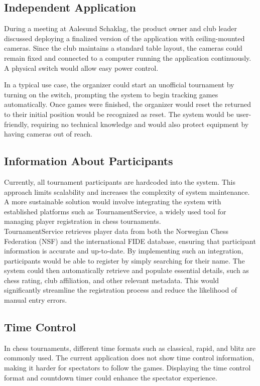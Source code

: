 \subsection{Independent Application}
During a meeting at Aalesund Schaklag, the product owner and club leader discussed deploying a finalized version of the application with ceiling-mounted cameras. Since the club maintains a standard table layout, the cameras could remain fixed and connected to a computer running the application continuously. A physical switch would allow easy power control.

In a typical use case, the organizer could start an unofficial tournament by turning on the switch, prompting the system to begin tracking games automatically. Once games were finished, the organizer would reset the  returned to their initial position would be recognized as reset. The system would be user-friendly, requiring no technical knowledge and would also protect equipment by having cameras out of reach.

\subsection{Information About Participants}
Currently, all tournament participants are hardcoded into the system. This approach limits scalability and increases the complexity of system maintenance. A more sustainable solution would involve integrating the system with established platforms such as TournamentService, a widely used tool for managing player registration in chess tournaments. \\

TournamentService retrieves player data from both the Norwegian Chess Federation (NSF) and the international FIDE database, ensuring that participant information is accurate and up-to-date.
By implementing such an integration, participants would be able to register by simply searching for their name. The system could then automatically retrieve and populate essential details, such as chess rating, club affiliation, and other relevant metadata. This would significantly streamline the registration process and reduce the likelihood of manual entry errors. \\


\subsection{Time Control}
In chess tournaments, different time formats such as \gls{classical}, \gls{rapid}, and \gls{blitz} are commonly used. The current application does not show time control information, making it harder for spectators to follow the games. Displaying the time control format and countdown timer could enhance the spectator experience. \\

